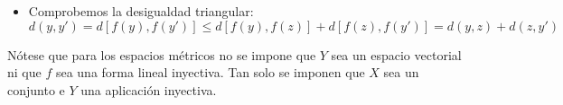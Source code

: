 \begin{ejercicio}
\begin{itemize}
        \item Comprobemos la desigualdad triangular:
        \begin{equation*}
            d(y,y') = d[f(y), f(y')] \leq d[f(y), f(z)]+ d[f(z), f(y')] = d(y,z) + d(z,y')
        \end{equation*}
    \end{itemize}
    Nótese que para los espacios métricos no se impone que $Y$ sea un espacio vectorial ni que $f$ sea una forma lineal inyectiva. Tan solo se imponen que $X$ sea un conjunto e $Y$ una aplicación inyectiva.
\end{ejercicio}